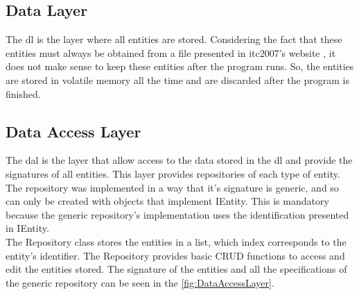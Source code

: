 \subsection{Data Layer}

The \gls{dl} is the layer where all entities are stored. Considering the fact that these entities must always be obtained from a file presented in \gls{itc2007}'s website \cite{McCollum2007a}, it does not make sense to keep these entities after the program runs. So, the entities are stored in volatile memory all the time and are discarded after the program is finished.

\subsection{Data Access Layer}

The \gls{dal} is the layer that allow access to the data stored in the \gls{dl} and provide the signatures of all entities. This layer provides repositories of each type of entity. The repository was implemented in a way that it's signature  is generic, and so can only be created with objects that implement IEntity. This is mandatory because the generic repository's implementation uses the identification presented in IEntity. \\

The Repository class stores the entities in a list, which index corresponds to the entity's identifier. The Repository provides basic CRUD functions to access and edit the entities stored. The signature of the entities and all the specifications of the generic repository can be seen in the \ref{fig:DataAccessLayer}.\\

